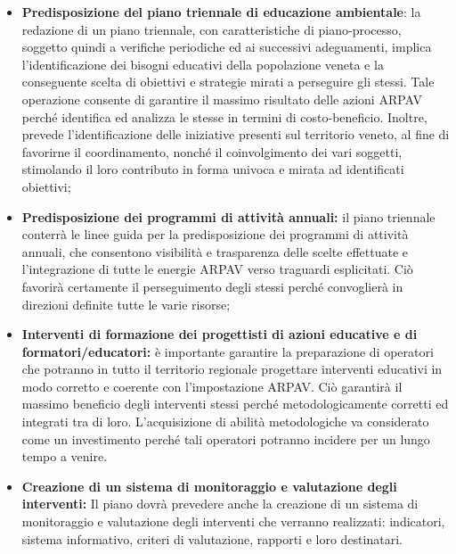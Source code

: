 \begin{itemize}

\item \textbf{Predisposizione del piano triennale di educazione ambientale}:
la redazione di un piano triennale, con caratteristiche di piano-processo, soggetto quindi a verifiche periodiche ed ai successivi adeguamenti, implica l'identificazione dei bisogni educativi della popolazione veneta e la conseguente scelta di obiettivi e strategie mirati a perseguire gli stessi. Tale operazione consente di garantire il massimo risultato delle azioni ARPAV perché identifica ed analizza le stesse in termini di costo-beneficio. Inoltre, prevede l'identificazione delle iniziative presenti sul territorio veneto, al fine di favorirne il coordinamento, nonché il coinvolgimento
dei vari soggetti, stimolando il loro contributo in forma univoca e mirata ad identificati obiettivi;

\item \textbf{Predisposizione dei programmi di attività annuali:}
il piano triennale
conterrà le linee guida per la predisposizione dei programmi di
attività annuali, che consentono visibilità e trasparenza delle scelte effettuate e
l'integrazione di tutte le energie ARPAV verso traguardi esplicitati. Ciò favorirà
certamente il perseguimento degli stessi perché convoglierà in direzioni definite
tutte le varie risorse;

\item \textbf{Interventi di formazione dei progettisti di azioni educative e di formatori/educatori:}
è importante garantire la preparazione di operatori che potranno in tutto il
territorio regionale progettare interventi educativi in modo corretto e coerente con
l'impostazione ARPAV. Ciò garantirà il massimo beneficio degli interventi stessi
perché metodologicamente corretti ed integrati tra di loro. L'acquisizione di abilità
metodologiche va considerato come un investimento perché tali operatori potranno
incidere per un lungo tempo a venire.

\item \textbf{Creazione di un sistema di monitoraggio e valutazione degli interventi:}
Il piano dovrà prevedere anche la creazione di un sistema di monitoraggio e valutazione degli interventi che verranno realizzati: indicatori, sistema informativo,
criteri di valutazione, rapporti e loro destinatari.

\end{itemize}